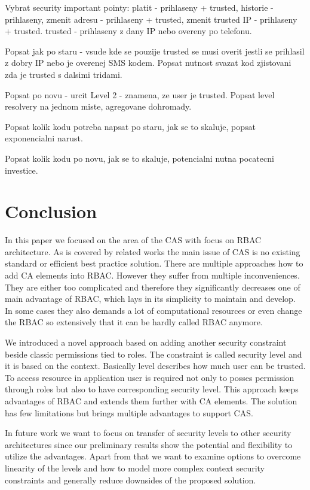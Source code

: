 \documentclass{sig-alternate}
\begin{document}
Vybrat security important pointy: platit - prihlaseny + trusted, historie - prihlaseny, zmenit adresu - prihlaseny + trusted, zmenit trusted IP - prihlaseny + trusted. trusted - prihlaseny z dany IP nebo overeny po telefonu.

Popsat jak po staru - vsude kde se pouzije trusted se musi overit jestli se prihlasil z dobry IP nebo je overenej SMS kodem. Popsat nutnost svazat kod zjistovani zda je trusted s dalsimi tridami.

Popsat po novu - urcit Level 2 - znamena, ze user je trusted. Popsat level resolvery na jednom miste, agregovane dohromady.

Popsat kolik kodu potreba napsat po staru, jak se to skaluje, popsat exponencialni narust.

Popsat kolik kodu po novu, jak se to skaluje, potencialni nutna pocatecni investice.

\section{Conclusion}
In this paper we focused on the area of the CAS with focus on RBAC architecture. As is covered by related works the main issue of CAS is no existing standard or efficient best practice solution. There are multiple approaches how to add CA elements into RBAC. However they suffer from multiple inconveniences. They are either too complicated and therefore they significantly decreases one of main advantage of RBAC, which lays in its simplicity to maintain and develop. In some cases they also demands a lot of computational resources or even change the RBAC so extensively that it can be hardly called RBAC anymore.

We introduced a novel approach based on adding another security constraint beside classic permissions tied to roles. The constraint is called security level and it is based on the context. Basically level describes how much user can be trusted. To access resource in application user is required not only to posses permission through roles but also to have corresponding security level. This approach keeps advantages of RBAC and extends them further with CA elements. The solution has few limitations but brings multiple advantages to support CAS. 

In future work we want to focus on transfer of security levels to other security architectures since our preliminary results show the potential and flexibility to utilize the advantages. Apart from that we want to examine options to overcome linearity of the levels and how to model more complex context security constraints and generally reduce downsides of the proposed solution.
\end{document}
